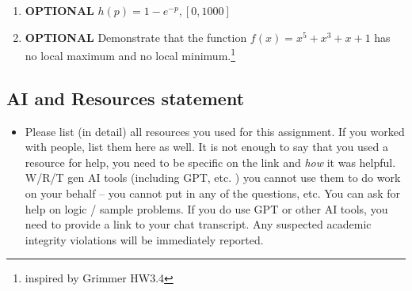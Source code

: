 \documentclass[
]{article}
\providecommand{\tightlist}{%
  \setlength{\itemsep}{0pt}\setlength{\parskip}{0pt}}
\begin{document}
\begin{enumerate}
\def\labelenumi{\alph{enumi}.}
\item
  \textbf{OPTIONAL} \(h(p) = 1 - e^{-p}, [0,1000]\)
\item
  \textbf{OPTIONAL} Demonstrate that the function
  \(f(x) = x^5 + x^3 + x + 1\) has no local maximum and no local
  minimum.\footnote{inspired by Grimmer HW3.4}
\end{enumerate}

\subsection{AI and Resources
statement}\label{ai-and-resources-statement}

\begin{itemize}
\tightlist
\item
  Please list (in detail) all resources you used for this assignment. If
  you worked with people, list them here as well. It is not enough to
  say that you used a resource for help, you need to be specific on the
  link and \emph{how} it was helpful. W/R/T gen AI tools (including GPT,
  etc. ) you cannot use them to do work on your behalf -- you cannot put
  in any of the questions, etc. You can ask for help on logic / sample
  problems. If you do use GPT or other AI tools, you need to provide a
  link to your chat transcript. Any suspected academic integrity
  violations will be immediately reported.
\end{itemize}
\end{document}
